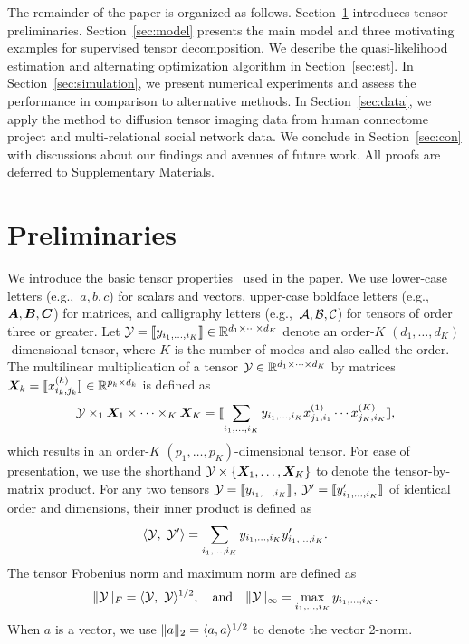 \documentclass[12pt]{article}
\theoremstyle{definition}
\theoremstyle{definition}
\begin{document}
The remainder of the paper is organized as follows. Section~\ref{sec:pre} introduces tensor preliminaries. Section~\ref{sec:model} presents the main model and three motivating examples for supervised tensor decomposition. We describe the quasi-likelihood estimation and alternating optimization algorithm in Section~\ref{sec:est}. In Section~\ref{sec:simulation}, we present numerical experiments and assess the performance in comparison to alternative methods. In Section~\ref{sec:data}, we apply the method to diffusion tensor imaging data from human connectome project and multi-relational social network data. We conclude in Section~\ref{sec:con} with discussions about our findings and avenues of future work. All proofs are deferred to Supplementary Materials. 

\section{Preliminaries}\label{sec:pre}
We introduce the basic tensor properties~\citep{kolda2009tensor} used in the paper. We use lower-case letters (e.g.,\ $a,b,c$) for scalars and vectors, upper-case boldface letters (e.g.,\ $\bm A, \bm B, \bm C$) for matrices, and calligraphy letters (e.g.,\ $\mathcal{A}, \mathcal{B}, \mathcal{C}$) for tensors of order three or greater. Let $\mathcal{Y}=\llbracket y_{i_1,\ldots,i_K} \rrbracket\in \mathbb{R}^{d_1\times \cdots\times d_K}$ denote an order-$K$ $(d_1,\ldots,d_K)$-dimensional tensor, where $K$ is the number of modes and also called the order. The multilinear multiplication of a tensor $\mathcal{Y}\in\mathbb{R}^{d_1\times \cdots\times d_K}$ by matrices $\bm X_k=\llbracket x_{i_k,j_k}^{(k)} \rrbracket\in\mathbb{R}^{p_k\times d_k}$ is defined as 
\[
\mathcal{Y} \times_1\bm X_1\times \cdots \times_K \bm X_K=\llbracket \sum_{i_1,\ldots,i_K}y_{i_1,\ldots,i_K}x_{j_1,i_1}^{(1)}\cdots x_{j_K,i_K}^{(K)} \rrbracket,
\]
which results in an order-$K$ $(p_1,\ldots,p_K)$-dimensional tensor. For ease of presentation, we use the shorthand $\mathcal{Y}\times\{\bm X_1,\ldots,\bm X_K\}$ to denote the tensor-by-matrix product. For any two tensors $\mathcal{Y}=\llbracket y_{i_1,\ldots,i_K} \rrbracket$, $\mathcal{Y}'=\llbracket y'_{i_1,\ldots,i_K} \rrbracket$ of identical order and dimensions, their inner product is defined as 
\[
\langle \mathcal{Y},\ \mathcal{Y}'\rangle =\sum_{i_1,\ldots,i_K}y_{i_1,\ldots,i_K}y'_{i_1,\ldots,i_K}.
\]
The tensor Frobenius norm and maximum norm are defined as
\[
\lVert\mathcal{Y}\rVert_F=\langle \mathcal{Y},\ \mathcal{Y} \rangle^{1/2},\quad \text{and}\quad \lVert\mathcal{Y}\rVert_\infty=\max_{i_1,\ldots,i_K}y_{i_1,\ldots,i_K}.
\]
When $a$ is a vector, we use $\lVert a\rVert_2=\langle a,a \rangle^{1/2}$ to denote the vector 2-norm. 
\end{document}

